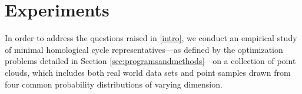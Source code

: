 \section{Experiments}\label{methods}


In order to address the questions raised in \se \ref{intro}, we conduct an empirical study of minimal homological cycle representatives---as defined by the optimization problems detailed in Section \ref{sec:programsandmethods}---on a collection of point clouds, which includes both real world data sets and point samples drawn from four common probability distributions of varying dimension. 






